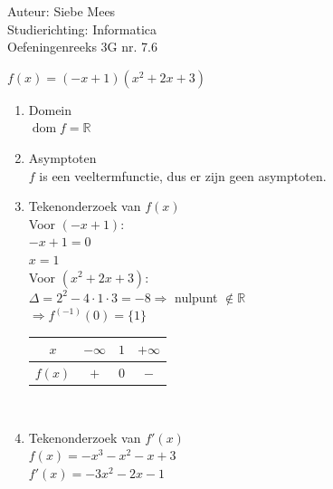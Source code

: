 \documentclass[a4paper]{article}
\begin{document}
  
\noindent \large Auteur: Siebe Mees \\
\noindent \large Studierichting: Informatica\\
\noindent \large Oefeningenreeks 3G nr. 7.6\\

\medskip

\normalsize

$f(x)=(-x+1)(x^2+2x+3)$\\

\begin{enumerate}
\item Domein\\

$\operatorname{dom}f=\mathbb{R}$\\


\item Asymptoten\\

$f$ is een veeltermfunctie, dus er zijn geen asymptoten.\\


\item Tekenonderzoek van $f(x)$\\

Voor $(-x+1)$:\\

$-x+1=0$\\

$x=1$\\

Voor $(x^2+2x+3)$:\\

$\Delta=2^2-4\cdot 1\cdot 3=-8 \Rightarrow$ nulpunt $\notin \mathbb{R}$\\

$\Rightarrow f^{(-1)}(0)=\{1\} $\\

\begin{tabular}{c|ccc}
$x$ & $-\infty$ & $1$ & $+\infty$ \\ \hline

$f(x)$ & $+$ & $0$ & $-$ \\

\end{tabular}\\


\item Tekenonderzoek van $f'(x)$\\

$f(x)=-x^3-x^2-x+3$\\

$f'(x)=-3x^2-2x-1$\\


\end{enumerate}
\end{document}
